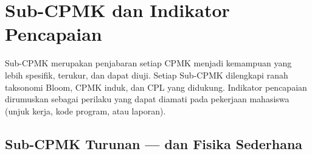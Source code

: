 
\section{Sub-CPMK dan Indikator Pencapaian}

Sub-CPMK merupakan penjabaran setiap CPMK menjadi kemampuan yang lebih
spesifik, terukur, dan dapat diuji. Setiap Sub-CPMK dilengkapi ranah taksonomi
Bloom, CPMK induk, dan CPL yang didukung. Indikator pencapaian dirumuskan
sebagai perilaku yang dapat diamati pada pekerjaan mahasiswa (unjuk kerja,
kode program, atau laporan).

\newcommand{\ind}[1]{\textbf{(#1)}}

\subsection{Sub-CPMK Turunan  ---  dan Fisika Sederhana}


